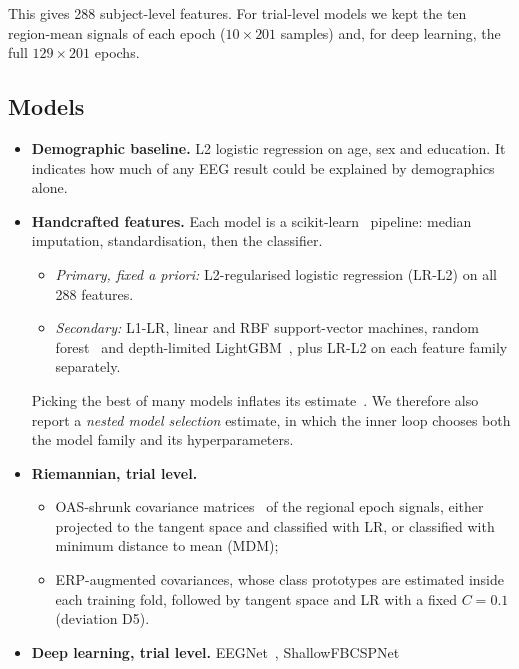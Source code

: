 This gives 288 subject-level features. For trial-level models we kept the ten region-mean signals of each epoch
($10\times201$ samples) and, for deep learning, the full $129\times201$ epochs.

\subsection{Models}
\begin{itemize}
  \item \textbf{Demographic baseline.} L2 logistic regression on age, sex and education. It indicates how much of
        any EEG result could be explained by demographics alone.
  \item \textbf{Handcrafted features.} Each model is a scikit-learn~\cite{pedregosa2011sklearn} pipeline: median
        imputation, standardisation, then the classifier.
        \begin{itemize}
          \item \emph{Primary, fixed a priori:} L2-regularised logistic regression (LR-L2) on all 288 features.
          \item \emph{Secondary:} L1-LR, linear and RBF support-vector machines, random forest~\cite{breiman2001rf}
                and depth-limited LightGBM~\cite{ke2017lightgbm}, plus LR-L2 on each feature family separately.
        \end{itemize}
        Picking the best of many models inflates its estimate~\cite{cawley2010overfitting}. We therefore also report a
        \emph{nested model selection} estimate, in which the inner loop chooses both the model family and its
        hyperparameters.
  \item \textbf{Riemannian, trial level.}~\cite{barachant2012multiclass,congedo2017riemannian}
        \begin{itemize}
          \item OAS-shrunk covariance matrices~\cite{chen2010oas} of the regional epoch signals, either projected
                to the tangent space and classified with LR, or classified with minimum distance to mean (MDM);
          \item ERP-augmented covariances, whose class prototypes are estimated inside each training fold, followed
                by tangent space and LR with a fixed $C=0.1$ (deviation D5).
        \end{itemize}
  \item \textbf{Deep learning, trial level.} EEGNet~\cite{lawhern2018eegnet}, ShallowFBCSPNet~\cite{schirrmeister2017deep}

\end{itemize}
